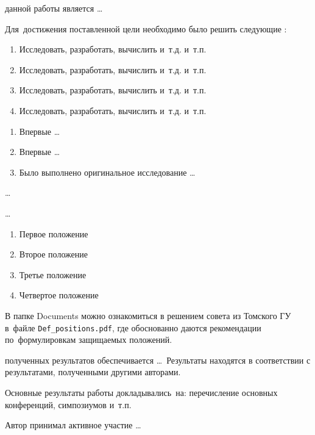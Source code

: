 
{\aim} данной работы является \ldots

Для~достижения поставленной цели необходимо было решить следующие {\tasks}:
\begin{enumerate}
  \item Исследовать, разработать, вычислить и~т.\:д. и~т.\:п.
  \item Исследовать, разработать, вычислить и~т.\:д. и~т.\:п.
  \item Исследовать, разработать, вычислить и~т.\:д. и~т.\:п.
  \item Исследовать, разработать, вычислить и~т.\:д. и~т.\:п.
\end{enumerate}


{\novelty}
\begin{enumerate}
  \item Впервые \ldots
  \item Впервые \ldots
  \item Было выполнено оригинальное исследование \ldots
\end{enumerate}

{\influence} \ldots

{\methods} \ldots

{}
\begin{enumerate}
  \item Первое положение
  \item Второе положение
  \item Третье положение
  \item Четвертое положение
\end{enumerate}
В папке Documents можно ознакомиться в решением совета из Томского ГУ
в~файле \verb+Def_positions.pdf+, где обоснованно даются рекомендации
по~формулировкам защищаемых положений.

{\reliability} полученных результатов обеспечивается \ldots \ Результаты находятся в соответствии с результатами, полученными другими авторами.


{\probation}
Основные результаты работы докладывались~на:
перечисление основных конференций, симпозиумов и~т.\:п.

{\contribution} Автор принимал активное участие \ldots

